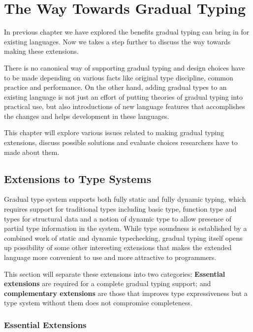 
\renewcommand{\thechapter}{3}

\chapter{The Way Towards Gradual Typing}


In previous chapter we have explored the benefits gradual typing
can bring in for existing languages.
Now we takes a step further to discuss the way towards making these extensions.

There is no canonical way of supporting gradual typing and design choices have to be made
depending on various facts like original type discipline, common practice and performance.
On the other hand, adding gradual types to an existing language
is not just an effort of putting theories of gradual typing into practical use,
but also introductions of new language features that accomplishes the changes
and helps development in these languages.

This chapter will explore various issues related to making gradual typing extensions,
discuss possible solutions and evaluate choices researchers have to made about them. 

\section{Extensions to Type Systems}

Gradual type system supports both fully static and fully dynamic typing,
which requires support for traditional types including
basic type, function type and types for structural data
and a notion of dynamic type to allow presence of partial type information in the system.
While type soundness is established by a combined work of static and dynamic typechecking,
gradual typing itself opens up possibility of some other interesting extensions
that makes the extended language more convenient to use and more attractive to programmers.

This section will separate these extensions into two categories:
\textbf{Essential extensions} are required for a complete gradual typing support;
and \textbf{complementary extensions} are those that improves type expressiveness
but a type system without them does not compromise completeness.

\subsection{Essential Extensions}

